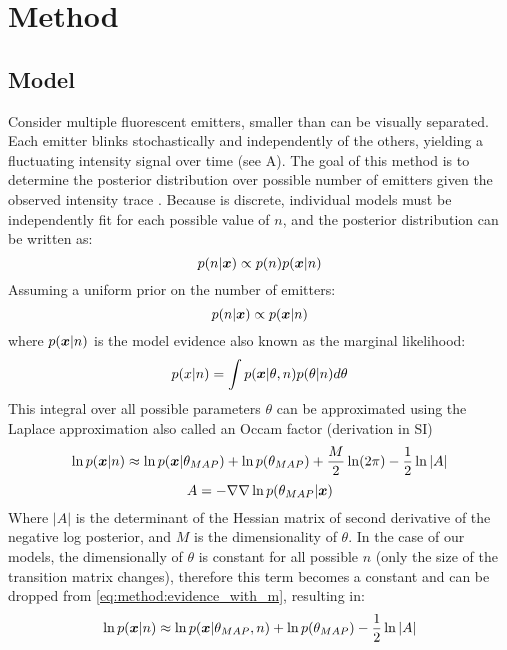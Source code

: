 \section{Method}

\subsection{Model}
Consider multiple fluorescent emitters, smaller than can be visually separated.
  Each emitter blinks stochastically and independently of the others, 
  yielding a fluctuating intensity signal over time (see  A).
  The goal of this method is to determine the posterior distribution over 
  possible number of emitters \ndist given the observed intensity trace \trace.
  Because \ndist is discrete, individual models must be independently fit 
  for each possible value of $n$, and the posterior distribution can be written as:
  \begin{equation*}
    p(n | \bm{x}) \propto p(n) p(\bm{x} | n)
  \end{equation*}
  Assuming a uniform prior on the number of emitters:
  \begin{equation*}
    p(n | \bm{x}) \propto p(\bm{x} | n)
  \end{equation*}
  where $p(\bm{x}|n)$ is the model evidence also known as the marginal likelihood:
  \begin{equation*}
    p(x | n) = \int p(\bm{x} | \theta, n) p(\theta | n) d\theta
  \end{equation*}
  This integral over all possible parameters $\theta$ can be approximated using the 
  Laplace approximation also called an Occam factor (derivation in SI) %
  \begin{equation}
    \ln p(\bm{x} | n) \approx \ln p(\bm{x} | \theta_{MAP}) + \ln p(\theta_{MAP}) + \frac{M}{2} \ln(2\pi) - \frac{1}{2} \ln |A|
    \label{eq:method:evidence_with_m}
  \end{equation}
  \begin{equation*}
    A = -\nabla \nabla \ln p(\theta_{MAP} | \bm{x})
  \end{equation*}
%
Where $|A|$ is the determinant of the Hessian matrix of second derivative
of the negative log posterior, and $M$ is the dimensionality of $\theta$. 
%
In the case of our models, the dimensionally of $\theta$ is constant 
for all possible $n$ (only the size of the transition matrix changes),
therefore this term becomes a constant and can be dropped from 
\eqref{eq:method:evidence_with_m}, resulting in:
\begin{equation}
  \ln p(\bm{x} | n) \approx \ln p(\bm{x} | \theta_{MAP}, n) + \ln p(\theta_{MAP}) - \frac{1}{2} \ln |A|
  \label{eq:method:evidence}
\end{equation}

